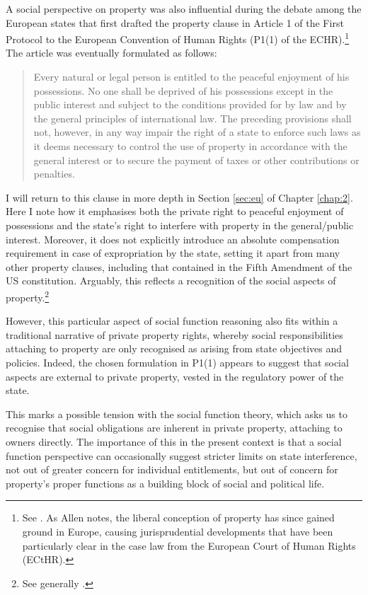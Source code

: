 A social perspective on property was also influential during the debate among the European states that first drafted the property clause in Article 1 of the First Protocol to the European Convention of Human Rights (P1(1) of the ECHR).\footnote{See \cite[1063-1065]{allen10}. As Allen notes, the liberal conception of property has since gained ground in Europe, causing jurisprudential developments that have been particularly clear in the case law from the European Court of Human Rights (ECtHR).} The article was eventually formulated as follows:

\begin{quote} Every natural or legal person is entitled to the peaceful enjoyment of his possessions. No one shall be deprived of his possessions except in the public interest and subject to the conditions provided for by law and by the general principles of international law.
The preceding provisions shall not, however, in any way impair the right of a state to enforce such laws as it deems necessary to control the use of property in accordance with the general interest or to secure the payment of taxes or other contributions or penalties.
\end{quote}

I will return to this clause in more depth in Section \ref{sec:eu} of Chapter \ref{chap:2}. Here I note how it emphasises both the private right to peaceful enjoyment of possessions and the state's right to interfere with property in the general/public interest. Moreover, it does not explicitly introduce an absolute compensation requirement in case of expropriation by the state, setting it apart from many other property clauses, including that contained in the Fifth Amendment of the US constitution. Arguably, this reflects a recognition of the social aspects of property.\footnote{See generally \cite{allen10}.} 

However, this particular aspect of social function reasoning also fits within a traditional narrative of private property rights, whereby social responsibilities attaching to property are only recognised as arising from state objectives and policies. Indeed, the chosen formulation in P1(1) appears to suggest that social aspects are external to private property, vested in the regulatory power of the state. 

This marks a possible tension with the social function theory, which asks us to recognise that social obligations are inherent in private property, attaching to owners directly. The importance of this in the present context is that a social function perspective can occasionally suggest stricter limits on state interference, not out of greater concern for individual entitlements, but out of concern for property's proper functions as a building block of social and political life.

